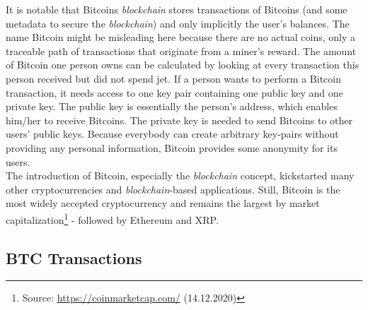 \documentclass{cacthesis}
\begin{document}
        It is notable that Bitcoins \textit{blockchain} stores transactions of Bitcoins (and some metadata to secure the \textit{blockchain}) and only implicitly the user's balances. The name Bitcoin might be misleading here because there are no actual coins, only a traceable path of transactions that originate from a miner's reward. The amount of Bitcoin one person owns can be calculated by looking at every transaction this person received but did not spend jet. If a person wants to perform a Bitcoin transaction, it needs access to one key pair containing one public key and one private key. The public key is essentially the person's address, which enables him/her to receive Bitcoins. The private key is needed to send Bitcoins to other users' public keys. Because everybody can create arbitrary key-pairs without providing any personal information, Bitcoin provides some anonymity for its users. \\
        The introduction of Bitcoin, especially the \textit{blockchain} concept, kickstarted many other cryptocurrencies and \textit{blockchain}-based applications. Still, Bitcoin is the most widely accepted cryptocurrency and remains the largest by market capitalization\footnote{Source: \url{https://coinmarketcap.com/} (14.12.2020)} - followed by Ethereum and XRP.

        \subsection{BTC Transactions}
        \label{sub:BTCTx}
        
\end{document}
